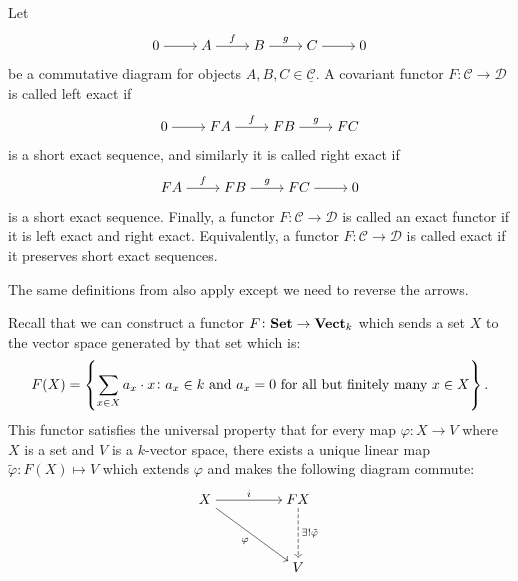 \documentclass[11pt,a4paper]{article}
\newcommand{\cC}{\mathcal C}
\newcommand{\cD}{\mathcal D}
\newcommand{\ucC}{\underline{\cC}}
\begin{document}
\begin{definition}
  \label{def:exact-functor}
  Let
  \[\begin{tikzcd}[ampersand replacement=\&,cramped]
    0 \& {A} \& {B} \& {C} \& 0
    \arrow[from=1-1, to=1-2]
    \arrow["f", from=1-2, to=1-3]
    \arrow["g", from=1-3, to=1-4]
    \arrow[from=1-4, to=1-5]
  \end{tikzcd}\]
  be a commutative diagram for objects $A,B,C \in \ucC$.
  A covariant functor $F \colon \cC \to \cD$ is called left exact if
  \[\begin{tikzcd}[ampersand replacement=\&,cramped]
    0 \& {FA} \& {FB} \& {FC}
    \arrow[from=1-1, to=1-2]
    \arrow["f", from=1-2, to=1-3]
    \arrow["g", from=1-3, to=1-4]
  \end{tikzcd}\]
  is a short exact sequence,
  and similarly it is called right exact if
  \[\begin{tikzcd}[ampersand replacement=\&,cramped]
    {FA} \& {FB} \& {FC} \& 0
    \arrow["f", from=1-1, to=1-2]
    \arrow["g", from=1-2, to=1-3]
    \arrow[from=1-3, to=1-4]
  \end{tikzcd}\]
  is a short exact sequence.
  Finally, a functor $F \colon \cC \to \cD$ is called an exact functor
  if it is left exact and right exact.
  Equivalently, a functor $F \colon \cC \to \cD$ is called exact if it
  preserves short exact sequences.
\end{definition}

\begin{remark}
  The same definitions from  also apply except
  we need to reverse the arrows.
\end{remark}

\begin{remark}
  Recall that we can construct a functor
  $F \colon \mathbf{Set} \to \mathbf{Vect}_k$
  which sends a set $X$ to the vector space generated by
  that set which is:
  \[
    F(X) = \left\{\sum_{x \in X} a_x \cdot x \colon
      a_x \in k \text{ and } a_x = 0 \text{ for all but finitely many $x \in X$}\right\}.
  \]
  This functor satisfies the universal property that
  for every map $\varphi \colon X \to V$ where $X$ is a set and $V$
  is a $k$-vector space,
  there exists a unique linear map $\tilde \varphi \colon F(X) \mapsto V$
  which extends $\varphi$ and makes the following diagram commute:
  \[\begin{tikzcd}[ampersand replacement=\&,cramped]
    X \&\& FX \\
    \\
    \&\& V
    \arrow["i", from=1-1, to=1-3]
    \arrow["\varphi"', from=1-1, to=3-3]
    \arrow["{\exists!\tilde\varphi}", dashed, from=1-3, to=3-3]
  \end{tikzcd}\]
\end{remark}
\end{document}
